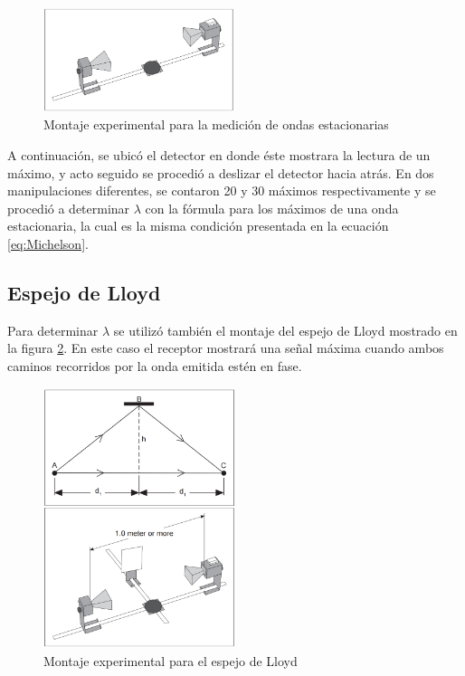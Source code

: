 \documentclass[prb,aps,twocolumn,preprintnumbers,amsmath,amssymb]{revtex4}
\begin{document}
\begin{figure}[h!]
\centering
\includegraphics[width=0.5\textwidth]{stationary}
\caption{Montaje experimental para la medición de ondas estacionarias}
\label{fig:estacionarias}
\end{figure}

A continuación, se ubicó el detector en donde éste mostrara la lectura de un máximo, y acto seguido se procedió a deslizar el detector hacia atrás. En dos manipulaciones diferentes, se contaron 20 y 30 máximos respectivamente y se procedió a determinar $ \lambda $ con la fórmula para los máximos de una onda estacionaria, la cual es la misma condición presentada en la ecuación \eqref{eq:Michelson}. 

\subsection{Espejo de Lloyd} 

Para determinar $ \lambda $ se utilizó también el montaje del espejo de Lloyd mostrado en la figura \ref{fig:espejo}. En este caso el receptor mostrará una señal máxima cuando ambos caminos recorridos por la onda emitida estén en fase. 

\begin{figure}[h!]
\centering
\includegraphics[width=0.5\textwidth]{lloyd}
\caption{Montaje experimental para el espejo de Lloyd}
\label{fig:espejo}
\end{figure}
\end{document}

